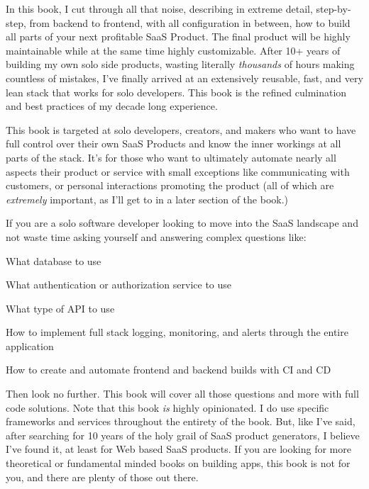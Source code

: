 \documentclass[a4paper,
                             oneside,
                             BCOR1.0cm,
                             DIV11,
                             parskip=full,
                             11pt]{scrbook}
\begin{document}
In this book, I cut through all that noise, describing in extreme detail, step-by-step, from backend to frontend, with all configuration in between, how to build all parts of your next profitable SaaS Product. The final product will be highly maintainable while at the same time highly customizable.  After 10+ years of building my own solo side products, wasting literally \textit{thousands} of hours making countless of mistakes, I've finally arrived at an extensively reusable, fast, and very lean stack that works for solo developers. This book is the refined culmination and best practices of my decade long experience.


This book is targeted at solo developers, creators, and makers who want to have full control over their own SaaS Products and know the inner workings at all parts of the stack. It's for those who want to ultimately automate nearly all aspects their product or service with small exceptions like communicating with customers, or personal interactions promoting the product (all of which are \textit{extremely} important, as I'll get to in a later section of the book.)

If you are a solo software developer looking to move into the SaaS landscape and not waste time asking yourself and answering complex questions like:

\begin{arrows}
\item What database to use
\item What authentication or authorization service to use
\item What type of API to use
\item How to implement full stack logging, monitoring, and alerts through the entire application
\item How to create and automate frontend and backend builds with CI and CD
\end{arrows}

Then look no further. This book will cover all those questions and more with full code solutions. Note that this book \textit{is} highly opinionated. I do use specific frameworks and services throughout the entirety of the book. But, like I've said, after searching for 10 years of the holy grail of SaaS product generators, I believe I've found it, at least for Web based SaaS products. If you are looking for more theoretical or fundamental minded books on building apps, this book is not for you, and there are plenty of those out there.
\end{document}
